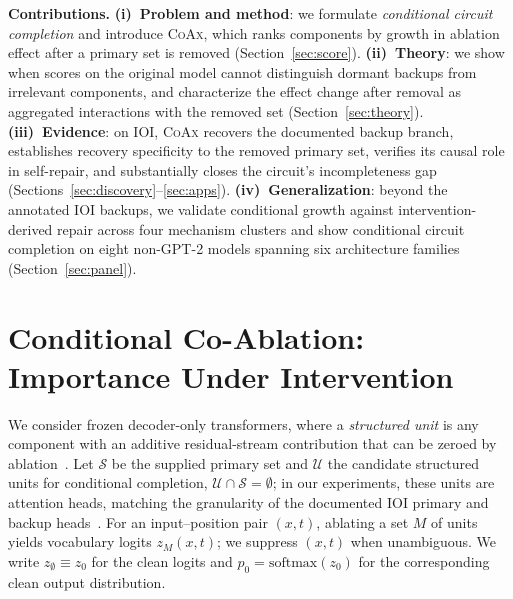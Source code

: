 \documentclass{article} %
\theoremstyle{plain}
\theoremstyle{definition}
\newcommand{\coax}{\textsc{CoAx}\xspace}
\newcommand{\Sset}{\mathcal{S}}
\newcommand{\Uset}{\mathcal{U}}
\begin{document}
\textbf{Contributions.}
\textbf{(i)~Problem and method}: we formulate \emph{conditional circuit completion} and introduce \coax, which ranks components by growth in ablation effect after a primary set is removed (Section~\ref{sec:score}).
\textbf{(ii)~Theory}: we show when scores on the original model cannot distinguish dormant backups from irrelevant components, and characterize the effect change after removal as aggregated interactions with the removed set (Section~\ref{sec:theory}).
\textbf{(iii)~Evidence}: on IOI, \coax recovers the documented backup branch, establishes recovery specificity to the removed primary set, verifies its causal role in self-repair, and substantially closes the circuit's incompleteness gap (Sections~\ref{sec:discovery}--\ref{sec:apps}).
\textbf{(iv)~Generalization}: beyond the annotated IOI backups, we validate conditional growth against intervention-derived repair across four mechanism clusters and show conditional circuit completion on eight non-GPT-2 models spanning six architecture families (Section~\ref{sec:panel}).



\section{Conditional Co-Ablation: Importance Under Intervention}
\label{sec:method}

We consider frozen decoder-only transformers, where a \emph{structured unit} is any component with an additive residual-stream contribution that can be zeroed by ablation~\citep{elhage2021framework}.
Let $\Sset$ be the supplied primary set and $\Uset$ the candidate structured units for conditional completion, $\Uset\cap\Sset=\emptyset$; in our experiments, these units are attention heads, matching the granularity of the documented IOI primary and backup heads~\citep{wang2022ioi}.
For an input--position pair $(x,t)$, ablating a set $M$ of units yields vocabulary logits $z_M(x,t)$; we suppress $(x,t)$ when unambiguous.
We write $z_\emptyset\equiv z_0$ for the clean logits and $p_0=\mathrm{softmax}(z_0)$ for the corresponding clean output distribution.
\end{document}
